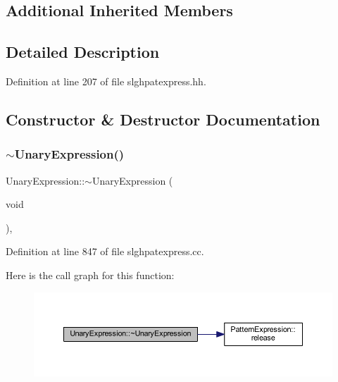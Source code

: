 \subsection*{Additional Inherited Members}


\subsection{Detailed Description}


Definition at line 207 of file slghpatexpress.\+hh.



\subsection{Constructor \& Destructor Documentation}
\mbox{\label{class_unary_expression_aadd788882f5f7d4208e9b8db8e571d57}} 
\subsubsection{\texorpdfstring{$\sim$UnaryExpression()}{~UnaryExpression()}}
{\footnotesize\ttfamily Unary\+Expression\+::$\sim$\+Unary\+Expression (\begin{DoxyParamCaption}\item[{void}]{ }\end{DoxyParamCaption})\hspace{0.3cm}{\ttfamily [protected]}, {\ttfamily [virtual]}}



Definition at line 847 of file slghpatexpress.\+cc.

Here is the call graph for this function\+:
\nopagebreak
\begin{figure}[H]
\begin{center}
\leavevmode
\includegraphics[width=350pt]{class_unary_expression_aadd788882f5f7d4208e9b8db8e571d57_cgraph}
\end{center}
\end{figure}
\mbox{\label{class_unary_expression_a911e7706dd555341854d13556f9141be}} 
